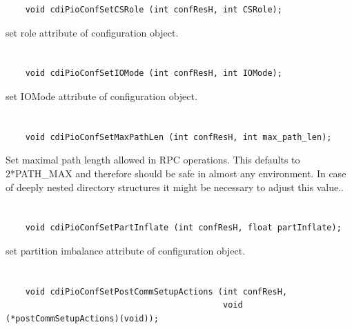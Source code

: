 \begin{verbatim}
    void cdiPioConfSetCSRole (int confResH, int CSRole);
\end{verbatim}

set role attribute of configuration object.


\section*{\tt {}}

\begin{verbatim}
    void cdiPioConfSetIOMode (int confResH, int IOMode);
\end{verbatim}

set IOMode attribute of configuration object.


\section*{\tt {}}

\begin{verbatim}
    void cdiPioConfSetMaxPathLen (int confResH, int max_path_len);
\end{verbatim}

Set maximal path length allowed in RPC
operations. This defaults to 2*PATH_MAX and therefore should be
safe in almost any environment. In case of deeply nested directory
structures it might be necessary to adjust this value..


\section*{\tt {}}

\begin{verbatim}
    void cdiPioConfSetPartInflate (int confResH, float partInflate);
\end{verbatim}

set partition imbalance attribute of
configuration object.


\section*{\tt {}}

\begin{verbatim}
    void cdiPioConfSetPostCommSetupActions (int confResH,
                                            void (*postCommSetupActions)(void));
\end{verbatim}

